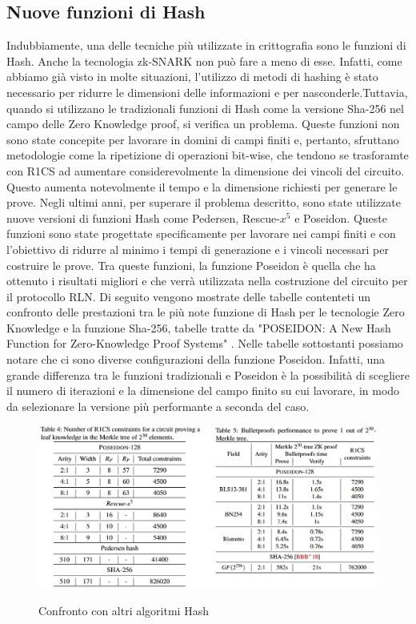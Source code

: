 \subsection{Nuove funzioni di Hash}
Indubbiamente, una delle tecniche più utilizzate in crittografia sono le funzioni di Hash. Anche la tecnologia zk-SNARK
non può fare a meno di esse. Infatti, come abbiamo già visto in molte situazioni, l'utilizzo di metodi di hashing è
stato necessario per ridurre le dimensioni delle informazioni e per nasconderle.Tuttavia, quando si utilizzano le
tradizionali funzioni di Hash come la versione Sha-256 nel campo delle Zero Knowledge proof, si verifica un problema.
Queste funzioni non sono state concepite per lavorare in domini di campi finiti e, pertanto, sfruttano metodologie come
la ripetizione di operazioni bit-wise, che tendono se trasforamte con R1CS ad aumentare considerevolmente la dimensione
dei vincoli del circuito. Questo aumenta notevolmente il tempo e la dimensione richiesti
per generare le prove. Negli ultimi anni, per superare il problema descritto, sono state utilizzate nuove versioni di
funzioni Hash come Pedersen, Rescue-$x^5$ e Poseidon. Queste funzioni sono state progettate specificamente per lavorare nei
campi finiti e con l'obiettivo di ridurre al minimo i tempi di generazione e i vincoli necessari per costruire le prove.
Tra queste funzioni, la funzione Poseidon è quella che ha ottenuto i risultati migliori e che verrà utilizzata nella
costruzione del circuito per il protocollo RLN. Di seguito vengono mostrate delle tabelle contenteti un confronto delle
prestazioni tra le più note funzione di Hash per le tecnologie Zero Knowledge e la funzione Sha-256, tabelle tratte da
"POSEIDON: A New Hash Function for Zero-Knowledge Proof Systems" \cite{cryptoeprint:2019-458}. Nelle tabelle sottostanti
possiamo notare che ci sono diverse configurazioni della funzione Poseidon. Infatti, una grande differenza tra le
funzioni tradizionali e Poseidon è la possibilità di scegliere il numero di iterazioni e la dimensione del campo finito
su cui lavorare, in modo da selezionare la versione più performante a seconda del caso.\\
\begin{figure}[H]
    \centering
    \includegraphics[width=14cm]{./chapters/2.rln-protocol/images/3.poseidon_comparison.png}
    \label{fig:poseidon_comparison}
    \captionsetup{justification=centering}
    \caption{Confronto con altri algoritmi Hash}
\end{figure}

